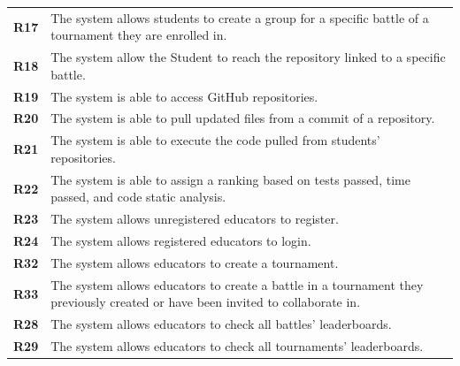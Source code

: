 \documentclass[12pt, a4paper]{report}
\begin{document}
\begin{table}[H]
\begin{tabularx}{\textwidth}{cX}
        \textbf{R17} & The system allows students to create a group for a specific battle of a tournament they are enrolled in.                         \\
        \textbf{R18} & The system allow the Student to reach the repository linked to a specific battle.                                                \\
        \textbf{R19} & The system is able to access GitHub repositories.                                                                                \\
        \textbf{R20} & The system is able to pull updated files from a commit of a repository.                                                          \\
        \textbf{R21} & The system is able to execute the code pulled from students' repositories.                                                       \\
        \textbf{R22} & The system is able to assign a ranking based on tests passed, time passed, and code static analysis.                             \\
        \textbf{R23} & The system allows unregistered educators to register.                                                                            \\
        \textbf{R24} & The system allows registered educators to login.                                                                                 \\
        \textbf{R32} & The system allows educators to create a tournament.                                                                              \\
        \textbf{R33} & The system allows educators to create a battle in a tournament they previously created or have been invited to collaborate in.   \\
        \textbf{R28} & The system allows educators to check all battles' leaderboards.                                                                  \\
        \textbf{R29} & The system allows educators to check all tournaments' leaderboards.                                                              \\
        
        \end{tabularx}
    \end{table}
\end{document}
